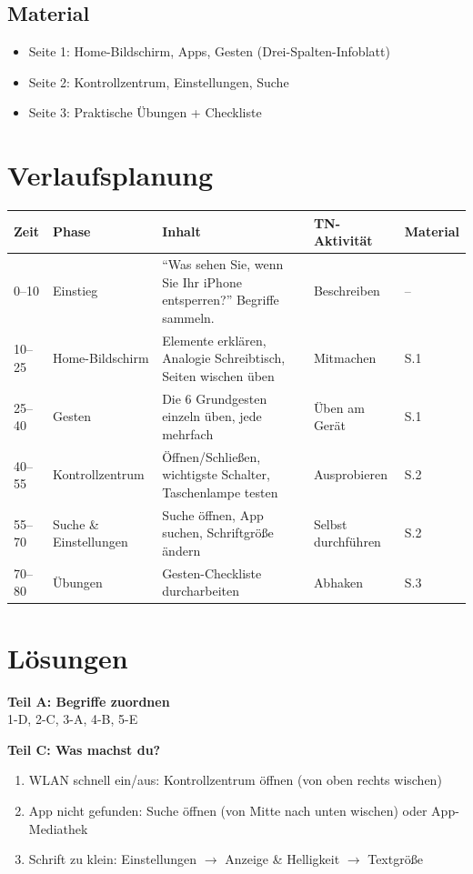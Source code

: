 \documentclass[11pt,a4paper]{article}
\begin{document}
\subsection{Material}
\begin{itemize}
    \item Seite 1: Home-Bildschirm, Apps, Gesten (Drei-Spalten-Infoblatt)
    \item Seite 2: Kontrollzentrum, Einstellungen, Suche
    \item Seite 3: Praktische Übungen + Checkliste
\end{itemize}

\section{Verlaufsplanung}

\begin{longtable}{|p{1cm}|p{2cm}|p{5cm}|p{3cm}|p{2cm}|}
\hline
\textbf{Zeit} & \textbf{Phase} & \textbf{Inhalt} & \textbf{TN-Aktivität} & \textbf{Material} \\
\hline
0--10 & Einstieg & ``Was sehen Sie, wenn Sie Ihr iPhone entsperren?'' Begriffe sammeln. & Beschreiben & -- \\
\hline
10--25 & Home-Bildschirm & Elemente erklären, Analogie Schreibtisch, Seiten wischen üben & Mitmachen & S.1 \\
\hline
25--40 & Gesten & Die 6 Grundgesten einzeln üben, jede mehrfach & Üben am Gerät & S.1 \\
\hline
40--55 & Kontrollzentrum & Öffnen/Schließen, wichtigste Schalter, Taschenlampe testen & Ausprobieren & S.2 \\
\hline
55--70 & Suche \& Einstellungen & Suche öffnen, App suchen, Schriftgröße ändern & Selbst durchführen & S.2 \\
\hline
70--80 & Übungen & Gesten-Checkliste durcharbeiten & Abhaken & S.3 \\
\hline
\end{longtable}

\section{Lösungen}

\textbf{Teil A: Begriffe zuordnen}\\
1-D, 2-C, 3-A, 4-B, 5-E

\textbf{Teil C: Was machst du?}
\begin{enumerate}
    \item WLAN schnell ein/aus: Kontrollzentrum öffnen (von oben rechts wischen)
    \item App nicht gefunden: Suche öffnen (von Mitte nach unten wischen) oder App-Mediathek
    \item Schrift zu klein: Einstellungen $\rightarrow$ Anzeige \& Helligkeit $\rightarrow$ Textgröße
\end{enumerate}
\end{document}
